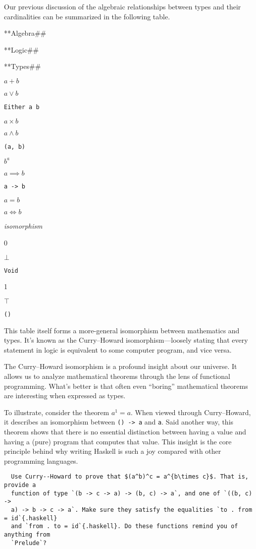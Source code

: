 \documentclass[
  11pt,
]{book}
\theoremstyle{nonumberplain}
\begin{document}
Our previous discussion of the algebraic relationships between types and
their cardinalities can be summarized in the following table.

**Algebra\#\#

**Logic\#\#

**Types\#\#

\(a + b\)

\(a \vee b\)

\texttt{Either\ a\ b}

\(a \times b\)

\(a \wedge b\)

\texttt{(a,\ b)}

\(b^a\)

\(a \implies b\)

\texttt{a\ -\textgreater{}\ b}

\(a=b\)

\(a \iff b\)

\emph{isomorphism}

0

\(\bot\)

\texttt{Void}

1

\(\top\)

\texttt{()}

This table itself forms a more-general isomorphism between mathematics
and types. It's known as the Curry--Howard isomorphism---loosely stating
that every statement in logic is equivalent to some computer program,
and vice versa.

The Curry--Howard isomorphism is a profound insight about our universe.
It allows us to analyze mathematical theorems through the lens of
functional programming. What's better is that often even ``boring''
mathematical theorems are interesting when expressed as types.

To illustrate, consider the theorem \(a^1 = a\). When viewed through
Curry--Howard, it describes an isomorphism between
\texttt{()\ -\textgreater{}\ a} and \texttt{a}. Said another way, this
theorem shows that there is no essential distinction between having a
value and having a (pure) program that computes that value. This insight
is the core principle behind why writing Haskell is such a joy compared
with other programming languages.

\begin{verbatim}
  Use Curry--Howard to prove that $(a^b)^c = a^{b\times c}$. That is, provide a
  function of type `(b -> c -> a) -> (b, c) -> a`, and one of `((b, c) ->
  a) -> b -> c -> a`. Make sure they satisfy the equalities `to . from = id`{.haskell}
  and `from . to = id`{.haskell}. Do these functions remind you of anything from
  `Prelude`?
\end{verbatim}
\end{document}

